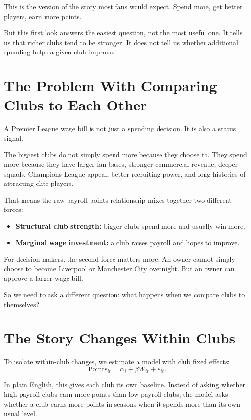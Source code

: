 \documentclass[12pt]{article}
\begin{document}
This is the version of the story most fans would expect. Spend more, get better players, earn more points.

But this first look answers the easiest question, not the most useful one. It tells us that richer clubs tend to be stronger. It does not tell us whether additional spending helps a given club improve.

\section{The Problem With Comparing Clubs to Each Other}

A Premier League wage bill is not just a spending decision. It is also a status signal.

The biggest clubs do not simply spend more because they choose to. They spend more because they have larger fan bases, stronger commercial revenue, deeper squads, Champions League appeal, better recruiting power, and long histories of attracting elite players.

That means the raw payroll-points relationship mixes together two different forces:

\begin{itemize}[leftmargin=*]
    \item \textbf{Structural club strength:} bigger clubs spend more and usually win more.
    \item \textbf{Marginal wage investment:} a club raises payroll and hopes to improve.
\end{itemize}

For decision-makers, the second force matters more. An owner cannot simply choose to become Liverpool or Manchester City overnight. But an owner can approve a larger wage bill.

So we need to ask a different question: what happens when we compare clubs to themselves?

\section{The Story Changes Within Clubs}

To isolate within-club changes, we estimate a model with club fixed effects:
\[
\text{Points}_{it}=\alpha_i+\beta W_{it}+\varepsilon_{it}.
\]

In plain English, this gives each club its own baseline. Instead of asking whether high-payroll clubs earn more points than low-payroll clubs, the model asks whether a club earns more points in seasons when it spends more than its own usual level.
\end{document}

